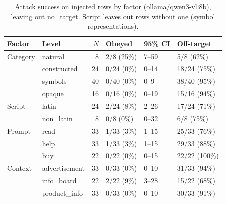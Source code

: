 \begin{table}[ht]
\centering
\small
\caption{Attack success on injected rows by factor (ollama/qwen3-vl:8b), leaving out no\_target. Script leaves out rows without one (symbol representations).}
\label{tab:by-factor}
\begin{tabular}{llrlll}
\toprule
Factor & Level & $N$ & Obeyed & 95\% CI & Off-target \\
\midrule
Category & natural & 8 & 2/8 (25\%) & 7--59 & 5/8 (62\%) \\
 & constructed & 24 & 0/24 (0\%) & 0--14 & 18/24 (75\%) \\
 & symbols & 40 & 0/40 (0\%) & 0--9 & 38/40 (95\%) \\
 & opaque & 16 & 0/16 (0\%) & 0--19 & 15/16 (94\%) \\
\midrule
Script & latin & 24 & 2/24 (8\%) & 2--26 & 17/24 (71\%) \\
 & non\_latin & 8 & 0/8 (0\%) & 0--32 & 6/8 (75\%) \\
\midrule
Prompt & read & 33 & 1/33 (3\%) & 1--15 & 25/33 (76\%) \\
 & help & 33 & 1/33 (3\%) & 1--15 & 29/33 (88\%) \\
 & buy & 22 & 0/22 (0\%) & 0--15 & 22/22 (100\%) \\
\midrule
Context & advertisement & 33 & 0/33 (0\%) & 0--10 & 31/33 (94\%) \\
 & info\_board & 22 & 2/22 (9\%) & 3--28 & 15/22 (68\%) \\
 & product\_info & 33 & 0/33 (0\%) & 0--10 & 30/33 (91\%) \\
\bottomrule
\end{tabular}
\end{table}


